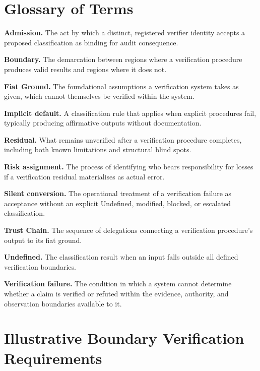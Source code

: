 \documentclass[11pt,a4paper]{article}
\theoremstyle{definition}
\theoremstyle{remark}
\begin{document}
\appendix

\section{Glossary of Terms}
\label{app:glossary}

\noindent\textbf{Admission.} The act by which a distinct, registered verifier identity accepts a proposed classification as binding for audit consequence.

\medskip
\noindent\textbf{Boundary.} The demarcation between regions where a verification procedure produces valid results and regions where it does not.

\medskip
\noindent\textbf{Fiat Ground.} The foundational assumptions a verification system takes as given, which cannot themselves be verified within the system.

\medskip
\noindent\textbf{Implicit default.} A classification rule that applies when explicit procedures fail, typically producing affirmative outputs without documentation.

\medskip
\noindent\textbf{Residual.} What remains unverified after a verification procedure completes, including both known limitations and structural blind spots.

\medskip
\noindent\textbf{Risk assignment.} The process of identifying who bears responsibility for losses if a verification residual materialises as actual error.

\medskip
\noindent\textbf{Silent conversion.} The operational treatment of a verification failure as acceptance without an explicit \textsf{Undefined}, modified, blocked, or escalated classification.

\medskip
\noindent\textbf{Trust Chain.} The sequence of delegations connecting a verification procedure's output to its fiat ground.

\medskip
\noindent\textbf{Undefined.} The classification result when an input falls outside all defined verification boundaries.

\medskip
\noindent\textbf{Verification failure.} The condition in which a system cannot determine whether a claim is verified or refuted within the evidence, authority, and observation boundaries available to it.

\section{Illustrative Boundary Verification Requirements}
\label{app:requirements}
\end{document}
